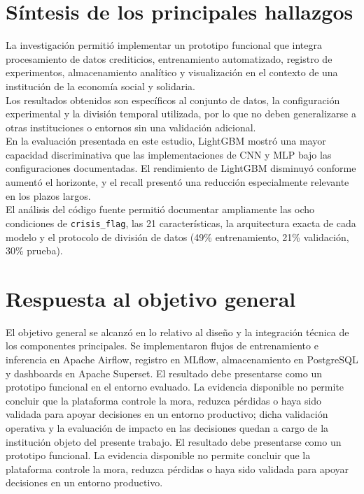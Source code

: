 \section{Síntesis de los principales hallazgos}

La investigación permitió implementar un prototipo funcional que integra procesamiento de datos crediticios, entrenamiento automatizado, registro de experimentos, almacenamiento analítico y visualización en el contexto de una institución de la economía social y solidaria.\\

Los resultados obtenidos son específicos al conjunto de datos, la configuración experimental y la división temporal utilizada, por lo que no deben generalizarse a otras instituciones o entornos sin una validación adicional.\\ 

En la evaluación presentada en este estudio, LightGBM mostró una mayor capacidad discriminativa que las implementaciones de CNN y MLP bajo las configuraciones documentadas. El rendimiento de LightGBM disminuyó conforme aumentó el horizonte, y el recall presentó una reducción especialmente relevante en los plazos largos.\\

El análisis del código fuente permitió documentar ampliamente las ocho condiciones de \texttt{crisis\_flag}, las 21 características, la arquitectura exacta de cada modelo y el protocolo de división de datos (49\% entrenamiento, 21\% validación, 30\% prueba).

\section{Respuesta al objetivo general}

El objetivo general se alcanzó en lo relativo al diseño y la integración técnica de los componentes principales. Se implementaron flujos de entrenamiento e inferencia en Apache Airflow, registro en MLflow, almacenamiento en PostgreSQL y dashboards en Apache Superset. El resultado debe presentarse como un prototipo funcional en el entorno evaluado. La evidencia disponible no permite concluir que la plataforma controle la mora, reduzca pérdidas o haya sido validada para apoyar decisiones en un entorno productivo; dicha validación operativa y la evaluación de impacto en las decisiones quedan a cargo de la institución objeto del presente trabajo. El resultado debe presentarse como un prototipo funcional. La evidencia disponible no permite concluir que la plataforma controle la mora, reduzca pérdidas o haya sido validada para apoyar decisiones en un entorno productivo.

